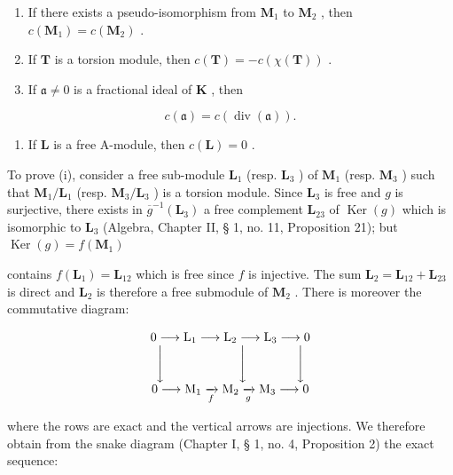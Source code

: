 \begin{enumerate}
\def\labelenumi{(\roman{enumi})}
\setcounter{enumi}{1}
\item
  If there exists a pseudo-isomorphism from \(\mathbf{M}_1\) to \(\mathbf{M}_2\) , then \(c(\mathbf{M}_1) = c(\mathbf{M}_2)\) .
\item
  If \(\mathbf{T}\) is a torsion module, then \(c(\mathbf{T}) = -c(\chi(\mathbf{T}))\) .
\item
  If \(\mathfrak{a} \neq 0\) is a fractional ideal of \(\mathbf{K}\) , then
\end{enumerate}

\[
c (\mathfrak {a}) = c (\operatorname{div} (\mathfrak {a})).
\]

\begin{enumerate}
\def\labelenumi{(\alph{enumi})}
\setcounter{enumi}{21}
\tightlist
\item
  If \(\mathbf{L}\) is a free A-module, then \(c(\mathbf{L}) = 0\) .
\end{enumerate}

To prove (i), consider a free sub-module \(\mathbf{L}_1\) (resp. \(\mathbf{L}_3\) ) of \(\mathbf{M}_1\) (resp. \(\mathbf{M}_3\) ) such that \(\mathbf{M}_1 / \mathbf{L}_1\) (resp. \(\mathbf{M}_3 / \mathbf{L}_3\) ) is a torsion module. Since \(\mathbf{L}_3\) is free and \(g\) is surjective, there exists in \(\overline{g}^{-1} (\mathbf{L}_3)\) a free complement \(\mathbf{L}_{23}\) of \(\operatorname {Ker}(g)\) which is isomorphic to \(\mathbf{L}_3\) (Algebra, Chapter II, § 1, no. 11, Proposition 21); but \(\operatorname {Ker}(g) = f(\mathbf{M}_1)\)

contains \(f(\mathbf{L}_1) = \mathbf{L}_{12}\) which is free since \(f\) is injective. The sum \(\mathbf{L}_2 = \mathbf{L}_{12} + \mathbf{L}_{23}\) is direct and \(\mathbf{L}_2\) is therefore a free submodule of \(\mathbf{M}_2\) . There is moreover the commutative diagram:

\[
\begin{array}{c} 0 \longrightarrow \mathrm{L} _ {1} \longrightarrow \mathrm{L} _ {2} \longrightarrow \mathrm{L} _ {3} \longrightarrow 0 \\ \Biggl \downarrow \qquad \qquad \qquad \Biggl \downarrow \qquad \qquad \Biggl \downarrow \\ 0 \longrightarrow \mathrm{M} _ {1} \xrightarrow [ f ]{} \mathrm{M} _ {2} \xrightarrow [ g ]{} \mathrm{M} _ {3} \longrightarrow 0 \end{array}
\]

where the rows are exact and the vertical arrows are injections. We therefore obtain from the snake diagram (Chapter I, § 1, no. 4, Proposition 2) the exact sequence:

